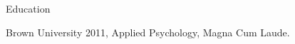 \documentclass[12pt]{res}
\begin{document}
{\begin{resume}
\begin{list}{}{\leftmargin=1em}
{\begin{list}{-}{\leftmargin=1em}
\end{list}}
\item
\item{\centering Education
\item 
\item
\begin{list}{-}{\leftmargin=1em}
\item Brown University 2011, Applied Psychology, Magna Cum Laude. 
\end{list}}
\item
\item
\end{list}

\end{resume}
} %
\end{document}
